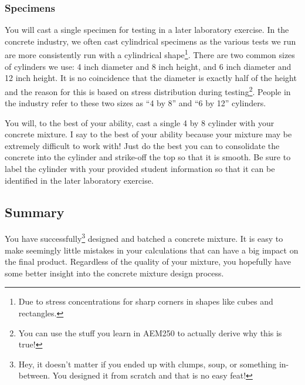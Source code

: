 \documentclass[12pt]{article}
\begin{document}
\subsubsection{Specimens}
You will cast a single specimen for testing in a later laboratory exercise. In the concrete industry, we often cast cylindrical specimens as the various tests we run are more consistently run with a cylindrical shape\footnote{Due to stress concentrations for sharp corners in shapes like cubes and rectangles.}. There are two common sizes of cylinders we use: 4 inch diameter and 8 inch height, and 6 inch diameter and 12 inch height. It is no coincidence that the diameter is exactly half of the height and the reason for this is based on stress distribution during testing\footnote{You can use the stuff you learn in AEM250 to actually derive why this is true!}. People in the industry refer to these two sizes as ``4 by 8'' and ``6 by 12'' cylinders.

You will, to the best of your ability, cast a single 4 by 8 cylinder with your concrete mixture. I say to the best of your ability because your mixture may be extremely difficult to work with! Just do the best you can to consolidate the concrete into the cylinder and strike-off the top so that it is smooth. Be sure to label the cylinder with your provided student information so that it can be identified in the later laboratory exercise.



\subsection{Summary}
You have successfully\footnote{Hey, it doesn't matter if you ended up with clumps, soup, or something in-between. You designed it from scratch and that is no easy feat!} designed and batched a concrete mixture. It is easy to make seemingly little mistakes in your calculations that can have a big impact on the final product. Regardless of the quality of your mixture, you hopefully have some better insight into the concrete mixture design process. 


\pagebreak
\end{document}
